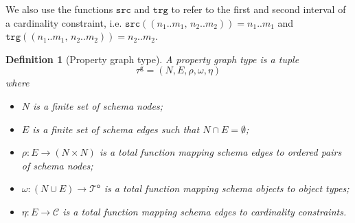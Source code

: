 \documentclass[a4paper]{article}
\newtheorem{definition}[theorem]{Definition}
\newcommand{\src}{\mathtt{src}}
\newcommand{\trg}{\mathtt{trg}}
\newcommand{\otypes}{\mathcal{T}^\mathsf{o}}
\newcommand{\gtype}{\tau^\mathsf{g}}
\begin{document}
We also use the functions $\src$ and $\trg$ to refer to the first and second interval of a cardinality constraint, i.e. $\src((n_1..m_1, \, n_2..m_2)) = n_1..m_1$ and $\trg((n_1..m_1, \, n_2..m_2)) = n_2..m_2$.

\begin{definition}[Property graph type]
  A \emph{property graph type} is a tuple $$\gtype = (N, E, \rho, \omega, \eta)$$ where
  \begin{itemize}
    \item $N$ is a finite set of schema nodes;
    \item $E$ is a finite set of schema edges such that $N \cap E = \emptyset$;
    \item $\rho : E \to (N \times N)$ is a total function mapping schema edges to ordered pairs of schema nodes;
    \item $\omega : (N \cup E) \to \otypes$ is a total function mapping schema objects to object types;
    \item $\eta : E \to \mathcal{C}$ is a total function mapping schema edges to cardinality constraints.
  \end{itemize}
\end{definition}
\end{document}
